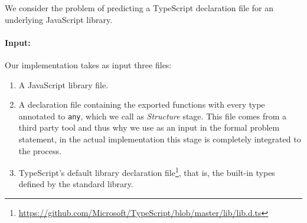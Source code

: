 \documentclass[sigplan,10pt,anonymous]{acmart} %
\theoremstyle{plain}
\theoremstyle{remark}
\theoremstyle{definition}
\begin{document}
We consider the problem of predicting a TypeScript declaration file
for an underlying JavaScript library.
\paragraph{Input:}
Our implementation takes as input three files:
\begin{enumerate}
  \item A JavaScript library file.
  \item A declaration file containing the exported functions with every type annotated to \texttt{any}, which we call as \textit{Structure} stage.
        This file comes from a third party tool and thus
        why we use as an input in the formal problem statement, in the actual
        implementation this stage is completely integrated to the process. 
  \item TypeScript's default library declaration
        file\footnote{\url{https://github.com/Microsoft/TypeScript/blob/master/lib/lib.d.ts}},
        that is, the built-in types defined by the standard library.
\end{enumerate}
\end{document}
